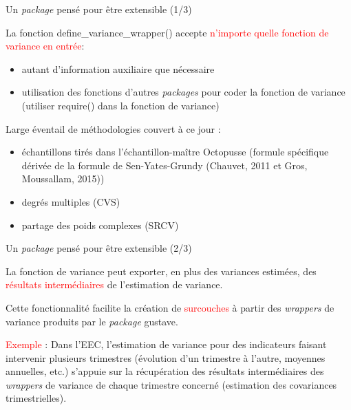 \documentclass[xcolor=dvipsnames]{beamer}
\begin{document}
\begin{frame}{Un \textit{package} pensé pour être extensible (1/3)}

La fonction define\_variance\_wrapper() accepte \textcolor{red}{n'importe quelle fonction de variance en entrée}: 
\vspace{0.2cm}
\begin{itemize}
    \item autant d'information auxiliaire que nécessaire
    \vspace{0.1 cm}
    \item utilisation des fonctions d'autres \textit{packages} pour coder la fonction de variance (utiliser require() dans la fonction de variance)
\end{itemize}

\vspace{0.4 cm}
Large éventail de méthodologies couvert à ce jour : 
\vspace{0.2cm}
\begin{itemize}
    \item échantillons tirés dans l'échantillon-maître Octopusse (formule spécifique dérivée de la formule de Sen-Yates-Grundy (Chauvet, 2011 et Gros, Moussallam, 2015))
    \vspace{0.1cm}
    \item degrés multiples (CVS)
    \vspace{0.1cm}
    \item partage des poids complexes (SRCV)
\end{itemize}

\end{frame}

\begin{frame}{Un \textit{package} pensé pour être extensible (2/3)}

La fonction de variance peut exporter, en plus des variances estimées, des \textcolor{red}{résultats intermédiaires} de l'estimation de variance.
    
\vspace{0.4 cm}

Cette fonctionnalité facilite la création de \textcolor{red}{surcouches} à partir des \textit{wrappers} de variance produits par le \textit{package} gustave.

\vspace{0.4 cm}

\textcolor{red}{Exemple} : Dans l'EEC, l'estimation de variance pour des indicateurs faisant intervenir plusieurs trimestres (évolution d'un trimestre à l'autre, moyennes annuelles, etc.) s'appuie sur la récupération des résultats intermédiaires des \textit{wrappers} de variance de chaque trimestre concerné (estimation des covariances trimestrielles).

\end{frame}
\end{document}

